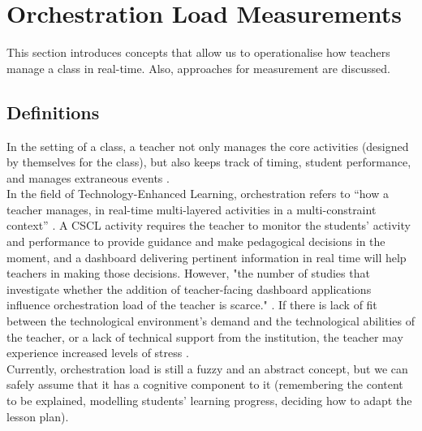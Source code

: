 \section{Orchestration Load Measurements} \label{soa_orchestration-load}
This section introduces concepts that allow us to operationalise how teachers manage a class in real-time. Also, approaches for measurement are discussed.
\subsection{Definitions}
In the setting of a class, a teacher not only manages the core activities (designed by themselves for the class), but also keeps track of timing, student performance, and manages extraneous events \cite{Dillenbourg2013-kx}. \\
In the field of Technology-Enhanced Learning, orchestration refers to “how a teacher manages, in real-time multi-layered activities in a multi-constraint context” \cite{Dillenbourg2013-kx}. A CSCL activity requires the teacher to monitor the students' activity and performance to provide guidance and make pedagogical decisions in the moment, and a dashboard delivering pertinent information in real time will help teachers in making those decisions. However, "the number of studies that investigate whether the addition of teacher-facing dashboard applications influence orchestration load of the teacher is scarce." \cite{Amarasinghe2020-wt}. If there is lack of fit between the technological environment's demand and the technological abilities of the teacher, or a lack of technical support from the institution, the teacher may experience increased levels of stress \cite{Al-Fudail2008-zo}.\\
Currently, orchestration load is still a fuzzy and an abstract concept, \cite{Prieto2015-gd} but we can safely assume that it has a cognitive component to it (remembering the content to be explained, modelling students’ learning progress, deciding how to adapt the lesson plan).
